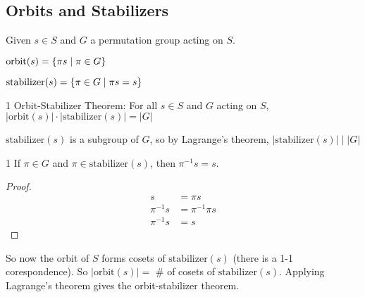 \label{36-0506}



\subsection{Orbits and Stabilizers}

Given $s \in S$ and $G$ a permutation group acting on $S$.

\begin{definition}
    $\text{orbit}(s) = \left\{ \pi s \mid \pi \in G \right\}$
\end{definition}

\begin{definition}
    $\text{stabilizer}(s) = \left\{ \pi \in G  \mid \pi s = s \right\}$
\end{definition}

\begin{theorem}1
    Orbit-Stabilizer Theorem: For all $s \in S$ and $G$ acting on $S$, $|\text{orbit}(s)| \cdot |\text{stabilizer}(s)| = |G|$
\end{theorem}

$\text{stabilizer}(s)$ is a subgroup of $G$, so by Lagrange's theorem, $|\text{stabilizer}(s)| \mid |G|$

\begin{lemma}1
    If $\pi \in G$ and $\pi \in \text{stabilizer}(s)$, then $\pi^{-1} s=s$.
\end{lemma}
\begin{proof}
    \begin{align*}
        s &= \pi s \\ 
        \pi^{-1} s &= \pi^{-1} \pi s \\ 
        \pi^{-1} s &= s
    \end{align*}
\end{proof}

So now the orbit of $S$ forms cosets of $\text{stabilizer}(s)$ (there is a 1-1 corespondence). 
So $|\text{orbit}(s)| = $ \# of cosets of $\text{stabilizer}(s)$. Applying Lagrange's theorem
gives the orbit-stabilizer theorem.
